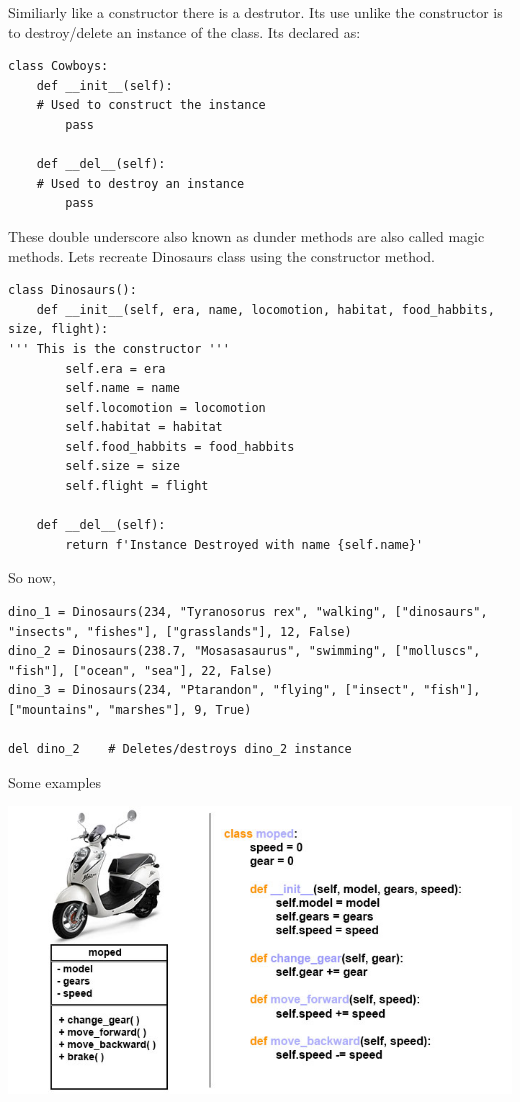 \documentclass[11pt]{article}
\begin{document}
Similiarly like a constructor there is a destrutor. Its use unlike the constructor is to destroy/delete an instance of the class. Its declared as:
\begin{verbatim}
class Cowboys:
    def __init__(self):
    # Used to construct the instance
        pass

    def __del__(self):
    # Used to destroy an instance
        pass
\end{verbatim}

These double underscore also known as dunder methods are also called magic methods. Lets recreate Dinosaurs class using the constructor method.

\begin{verbatim}
class Dinosaurs():
    def __init__(self, era, name, locomotion, habitat, food_habbits, size, flight):
''' This is the constructor '''
        self.era = era
        self.name = name
        self.locomotion = locomotion
        self.habitat = habitat
        self.food_habbits = food_habbits
        self.size = size
        self.flight = flight

    def __del__(self):
        return f'Instance Destroyed with name {self.name}'
\end{verbatim}

So now,
\begin{verbatim}
dino_1 = Dinosaurs(234, "Tyranosorus rex", "walking", ["dinosaurs", "insects", "fishes"], ["grasslands"], 12, False)
dino_2 = Dinosaurs(238.7, "Mosasasaurus", "swimming", ["molluscs", "fish"], ["ocean", "sea"], 22, False)
dino_3 = Dinosaurs(234, "Ptarandon", "flying", ["insect", "fish"], ["mountains", "marshes"], 9, True)

del dino_2    # Deletes/destroys dino_2 instance
\end{verbatim}

Some examples


\begin{center}
\includegraphics[width=.9\linewidth]{./img/moped_class.jpg}
\end{center}
\end{document}
